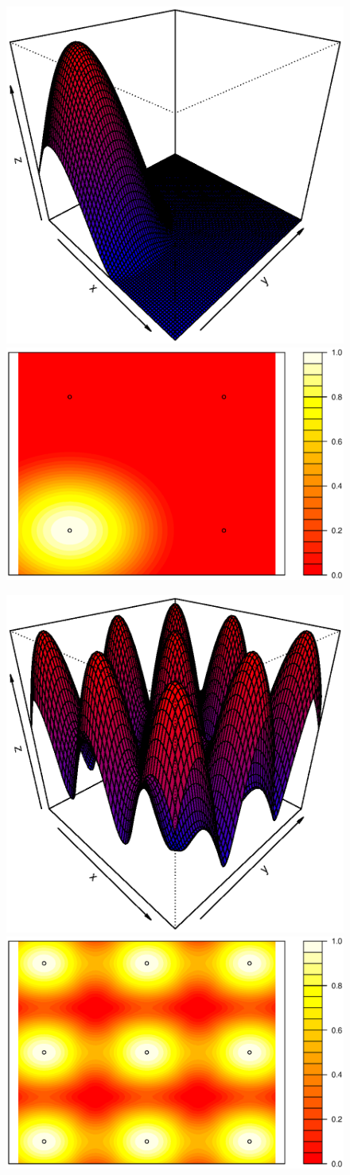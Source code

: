 \documentclass[11pt]{article}
\begin{document}
\begin{figure}[!ht]
\centering
\includegraphics[width=0.55\columnwidth]{./Images/res1}
\includegraphics[width=0.44\columnwidth]{./Images/res11}
\caption{}
\label{fig:res1}
\end{figure}

\begin{figure}[!ht]
\centering
\includegraphics[width=0.55\columnwidth]{./Images/res2}
\includegraphics[width=0.44\columnwidth]{./Images/res21}
\caption{}
\label{fig:res2}
\end{figure}
\end{document}
